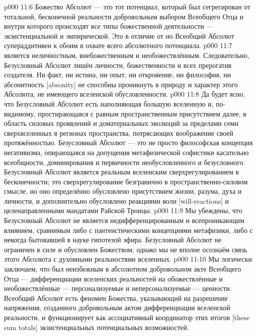 \vs p000 11:6 Божество Абсолют --- это тот потенциал, который был сегрегирован от тотальной, бесконечной реальности добровольным выбором Всеобщего Отца и внутри которого происходят все типы божественной деятельности --- экзистенциальной и эмпирической. Это  в отличие от  но Всеобщий Абсолют супераддитивен к обоим в охвате всего абсолютного потенциала.
\vs p000 11:7 \pc {}\bibnobreakspace {} является неличностным, внебожественным и необожествлённым. Следовательно, Безусловный Абсолют лишён личности, божественности и всех прерогатив создателя. Ни факт, ни истина, ни опыт, ни откровение, ни философия, ни абсонитность [absonity] не способны проникнуть в природу и характер этого Абсолюта, не имеющего вселенской обусловленности.
\vs p000 11:8 Да будет ясно, что Безусловный Абсолют есть  наполняющая большую вселенную и, по\hyp{}видимому, простирающаяся с равным пространственным присутствием далее, в область силовых проявлений и доматериальных эволюций за пределами семи сверхвселенных в регионах пространства, потрясающих воображение своей протяжённостью. Безусловный Абсолют --- это не просто философская концепция негативизма, опирающаяся на допущения метафизической софистики касательно всеобщности, доминирования и первичности необусловленного и безусловного. Безусловный Абсолют является реальным вселенским сверхрегулированием в бесконечности; это сверхрегулирование безгранично в пространственно\hyp{}силовом смысле, но оно определённо обусловлено присутствием жизни, разума, духа и личности, и дополнительно обусловлено реакциями воли [will\hyp{}reactions] и целенаправленными мандатами Райской Троицы.
\vs p000 11:9 Мы убеждены, что Безусловный Абсолют не является недифференцированным и всепроникающим влиянием, сравнимым либо с пантеистическими концепциями метафизики, либо с некогда бытовавшей в науке гипотезой эфира. Безусловный Абсолют не ограничен в силе и обусловлен Божеством, однако мы не вполне осознаём связь этого Абсолюта с духовными реальностями вселенных.
\vs p000 11:10 \pc {}\bibnobreakspace Мы логически заключаем, что  был неизбежным в абсолютном добровольном акте Всеобщего Отца --- дифференциации вселенских реальностей на обожествлённые и необожествлённые --- персонализуемые и неперсонализуемые --- ценности. Всеобщий Абсолют есть феномен Божества, указывающий на разрешение напряжения, созданного добровольным актом дифференциации вселенской реальности, и функционирует как ассоциативный координатор этих итогов [these sum totals] экзистенциальных потенциальных возможностей.
